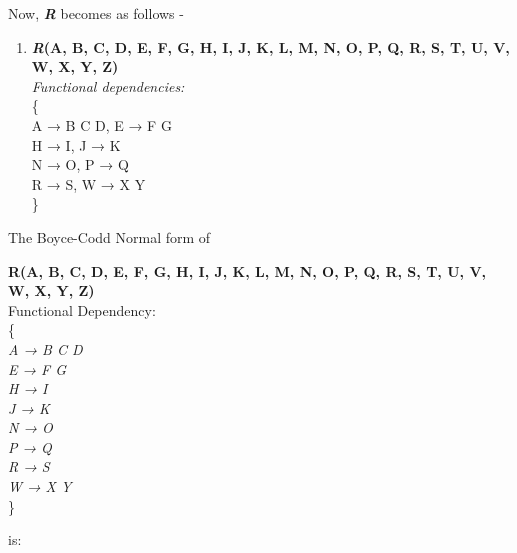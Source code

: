 Now, \textbf{\emph{R}} becomes as follows -\\
\begin{enumerate}
\item \textbf{\emph{R}(A, B, C, D, E, F, G, H, I, J, K, L, M, N, O, P, Q, R, S, T, U, V, W, X, Y, Z)}\\
\textit{Functional dependencies:}\\
\{\\
\hspace{1cm} A → B C D, E → F G\\
\hspace{1cm} H → I, J → K\\
\hspace{1cm} N → O, P → Q\\
\hspace{1cm} R → S, W → X Y\\
\}
\end{enumerate}

The Boyce-Codd Normal form of\\

\begin{adjustwidth}{2cm}{}
\textbf{R(A, B, C, D, E, F, G, H, I, J, K, L, M, N, O, P, Q, R, S, T, U, V, W, X, Y, Z)}\\
Functional Dependency:\\
\{\\
\textit{
A → B C D\\
E → F G\\
H → I\\
J → K\\
N → O\\
P → Q\\
R → S\\
W → X Y\\
} 
\}\\
\end{adjustwidth}
is:

